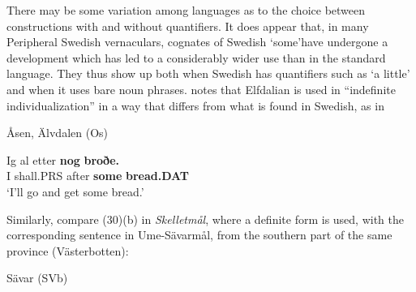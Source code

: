 

There may be some variation among languages as to the choice between constructions with and without quantifiers. It does appear that, in many Peripheral Swedish vernaculars, cognates of Swedish  ‘some’\textstyleLinguisticExample{ }have undergone a development which has led to a considerably wider use than in the standard language. They thus show up both when Swedish has quantifiers such as  ‘a little’ and when it uses bare noun phrases. \citet[110]{Levander1909} notes that Elfdalian is used in “indefinite individualization” in a way that differs from what is found in Swedish, as in 


\item 

Åsen, Älvdalen (Os)



 \ea\label{}
\gll Ig  al  etter  \textbf{nog}\textbf{  broðe.}\\


I  shall.PRS  after  \textbf{some} \textbf{bread.DAT}\\

\glt ‘I’ll go and get some bread.’ 

\z

Similarly, compare (30)(b) in \textit{Skelletmål}, where a definite form  is used, with the corresponding sentence in Ume-Sävarmål, from the southern part of the same province (Västerbotten):


\item 

Sävar (SVb)

